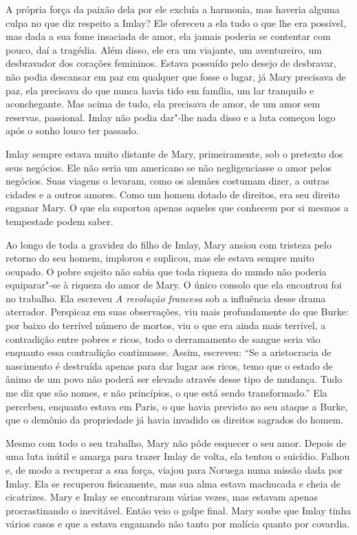 A própria força da paixão dela por ele excluía a harmonia, mas haveria
alguma culpa no que diz respeito a Imlay? Ele ofereceu a ela tudo
o que lhe era possível, mas dada a sua fome insaciada de amor, ela
jamais poderia se contentar com pouco, daí a tragédia. Além disso, ele
era um viajante, um aventureiro, um desbravador dos corações femininos.
Estava possuído pelo desejo de desbravar, não podia descansar em paz
em qualquer que fosse o lugar, já Mary precisava de paz, ela precisava
do que nunca havia tido em família, um lar tranquilo e aconchegante. Mas
acima de tudo, ela precisava de amor, de um amor sem reservas,
passional. Imlay não podia dar"-lhe nada disso e a luta começou logo após
o sonho louco ter passado.

Imlay sempre estava muito distante de Mary, primeiramente, sob o
pretexto dos seus negócios. Ele não seria um americano se não negligenciasse o
amor pelos negócios. Suas viagens o levaram, como os alemães costumam
dizer, a outras cidades e a outros amores. Como um homem dotado de
direitos, era seu direito enganar Mary. O que ela suportou apenas
aqueles que conhecem por si mesmos a tempestade podem saber.

Ao longo de toda a gravidez do filho de Imlay, Mary ansiou com tristeza
pelo retorno do seu homem, implorou e suplicou, mas ele estava sempre muito ocupado.
O pobre sujeito não sabia que toda riqueza do mundo não poderia
equiparar"-se à riqueza do amor de Mary. O único consolo que ela
encontrou foi no trabalho. Ela escreveu \textit{A revolução francesa} sob
a influência desse drama aterrador. Perspicaz em suas observações,
viu mais profundamente do que Burke: por baixo do terrível número de
mortos, viu o que era ainda mais terrível, a contradição entre
pobres e ricos, todo o derramamento de sangue seria vão enquanto essa
contradição continuasse. Assim, escreveu: ``Se a aristocracia de
nascimento é destruída apenas para dar lugar aos ricos, temo que o estado de ânimo de um povo não poderá ser elevado através desse tipo de mudança. Tudo me diz que
são nomes, e não princípios, o que está sendo transformado.'' Ela
percebeu, enquanto estava em Paris, o que havia previsto no seu ataque a
Burke, que o demônio da propriedade já havia invadido os direitos
sagrados do homem.

Mesmo com todo o seu trabalho, Mary não pôde esquecer o seu amor. Depois
de uma luta inútil e amarga para trazer Imlay de volta, ela tentou o
suicídio. Falhou e, de modo a recuperar a sua força, viajou para Noruega
numa missão dada por Imlay. Ela se recuperou fisicamente, mas sua alma
estava machucada e cheia de cicatrizes. Mary e Imlay se encontraram várias
vezes, mas estavam apenas procrastinando o inevitável. Então veio o
golpe final. Mary soube que Imlay tinha vários casos e que a estava
enganando não tanto por malícia quanto por covardia.


